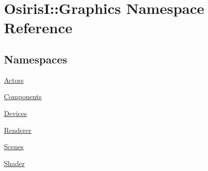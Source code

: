 \hypertarget{namespace_osiris_i_1_1_graphics}{\section{Osiris\-I\-:\-:Graphics Namespace Reference}
\label{namespace_osiris_i_1_1_graphics}
}
\subsection*{Namespaces}
\begin{DoxyCompactItemize}
\item 
\hyperlink{namespace_osiris_i_1_1_graphics_1_1_actors}{Actors}
\item 
\hyperlink{namespace_osiris_i_1_1_graphics_1_1_components}{Components}
\item 
\hyperlink{namespace_osiris_i_1_1_graphics_1_1_devices}{Devices}
\item 
\hyperlink{namespace_osiris_i_1_1_graphics_1_1_renderer}{Renderer}
\item 
\hyperlink{namespace_osiris_i_1_1_graphics_1_1_scenes}{Scenes}
\item 
\hyperlink{namespace_osiris_i_1_1_graphics_1_1_shader}{Shader}
\end{DoxyCompactItemize}
